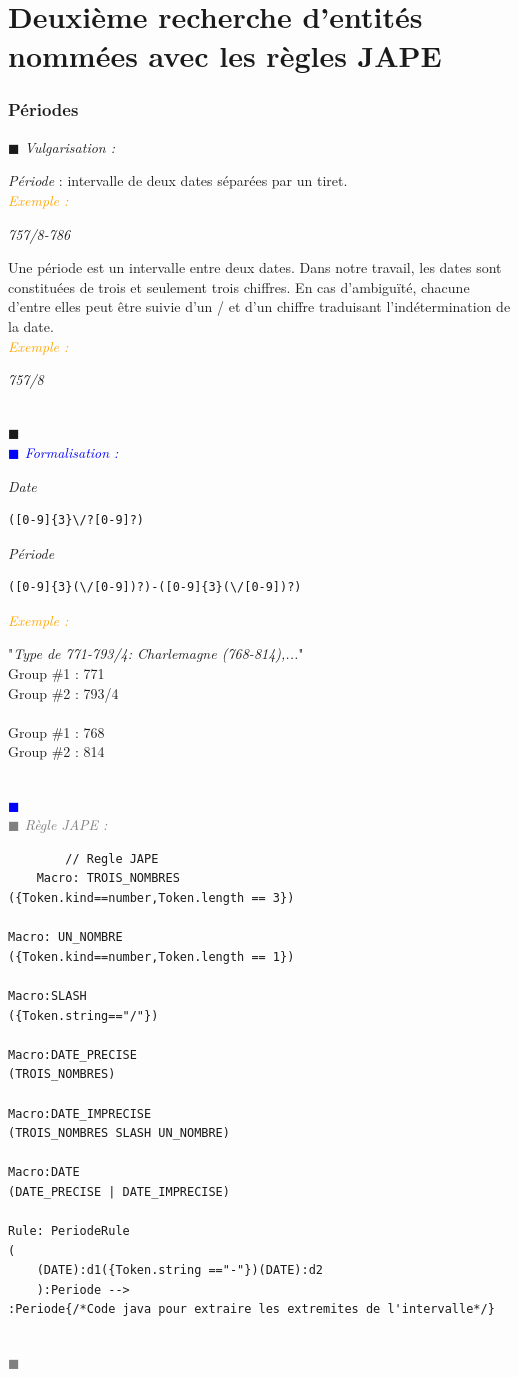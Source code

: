 \documentclass[a4paper, 11pt]{report}
\newenvironment{vulgarisation}
    {
    \textit{\textcolor{dark-blue}{$\blacksquare$  Vulgarisation : \\}}

    }
    {
    ~\\\textcolor{dark-blue}{$\blacksquare$}\\
    }
\newenvironment{formalisation}
    {
    \textit{\textcolor{blue}{$\blacksquare$  Formalisation : \\}}
    }
    {
    ~\\\textcolor{blue}{$\blacksquare$}\\
    }
\newenvironment{codage}
    {
    \textit{\textcolor{gray}{$\blacksquare$  Règle JAPE : \\}}
    }
    {
    ~\\\textcolor{gray}{$\blacksquare$}\\
    }
\newenvironment{exemple}
    {
    \textit{\textcolor{orange}{
    Exemple : \\}}
    }
    {~\\
    }
\begin{document}
    \section{Deuxième recherche d'entités nommées avec les règles JAPE}
    \subsubsection{Périodes}
\begin{vulgarisation}
    \textit{Période} : intervalle de deux dates séparées par un tiret.\\
    \begin{exemple}
        \textit{757/8-786}
    \end{exemple}
    
    Une période est un intervalle entre deux dates. Dans notre travail, les dates sont constituées de trois et seulement trois chiffres. En cas d'ambiguïté, chacune d'entre elles peut être suivie d'un \og/\fg{} et d'un chiffre traduisant l'indétermination de la date.\\
    \begin{exemple}
        \textit{757/8}
    \end{exemple}
    
\end{vulgarisation}
\begin{formalisation}
    \textit{Date}
    \begin{verbatim}
([0-9]{3}\/?[0-9]?)
    \end{verbatim}
    \textit{Période}
    \begin{verbatim}
([0-9]{3}(\/[0-9])?)-([0-9]{3}(\/[0-9])?)
    \end{verbatim}
    \begin{exemple}
        "\emph{Type de 771-793/4: Charlemagne (768-814),...}" \\
        Group \#1 : 771 \\
        Group \#2 : 793/4\\\\\noindent
        Group \#1 : 768 \\
        Group \#2 : 814
    \end{exemple}
\end{formalisation}
    \begin{codage}
    \begin{lstlisting}
        // Regle JAPE
    Macro: TROIS_NOMBRES
({Token.kind==number,Token.length == 3})

Macro: UN_NOMBRE
({Token.kind==number,Token.length == 1})

Macro:SLASH
({Token.string=="/"})

Macro:DATE_PRECISE
(TROIS_NOMBRES)

Macro:DATE_IMPRECISE
(TROIS_NOMBRES SLASH UN_NOMBRE)

Macro:DATE
(DATE_PRECISE | DATE_IMPRECISE)

Rule: PeriodeRule
(
    (DATE):d1({Token.string =="-"})(DATE):d2
    ):Periode -->
:Periode{/*Code java pour extraire les extremites de l'intervalle*/}
    \end{lstlisting}
    \end{codage}
    
\end{document}

